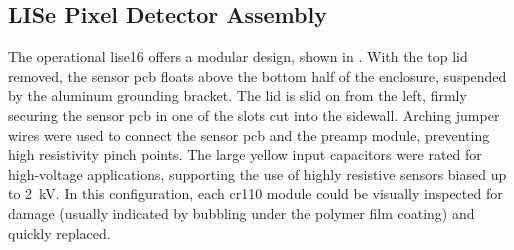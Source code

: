 \documentclass[../../../main.tex]{subfiles}%
\begin{document}
%
    \subsection{LISe Pixel Detector Assembly}%
    \label{sec:chapter-3:multi-channel-system:imager-assembly}%
    The operational \gls{lise16} offers a modular design, shown in .
    With the top lid removed, the sensor \gls{pcb} floats above the bottom half of the enclosure, suspended by the aluminum grounding bracket.
    The lid is slid on from the left, firmly securing the sensor \gls{pcb} in one of the slots cut into the sidewall.
    Arching jumper wires were used to connect the sensor \gls{pcb} and the \gls{preamp} module, preventing high resistivity pinch points.
    The large yellow input capacitors were rated for \gls{high-voltage} applications, supporting the use of highly resistive sensors biased up to \SI{2}{\kilo\volt}.
    In this configuration, each \gls{cr110} module could be visually inspected for damage (usually indicated by bubbling under the polymer film coating) and quickly replaced.
\end{document}
